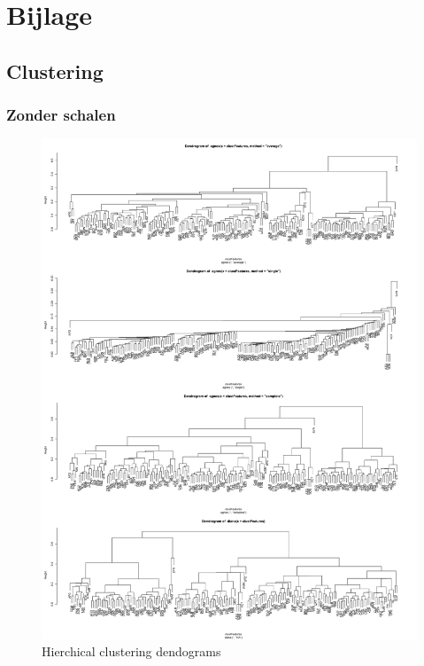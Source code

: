 \documentclass[a4paper,kulak]{kulakarticle}
\begin{document}
\newpage
\section{Bijlage} \label{b}
\subsection{Clustering}
\subsubsection{Zonder schalen}
\begin{figure}[H]
	\centering
	\includegraphics[height=\textheight]{figures/hierachicalClusteringNoScalingDendogram.jpg}
	\caption{Hierchical clustering dendograms}
	\label{fig:hcnd}
\end{figure}
\end{document}
